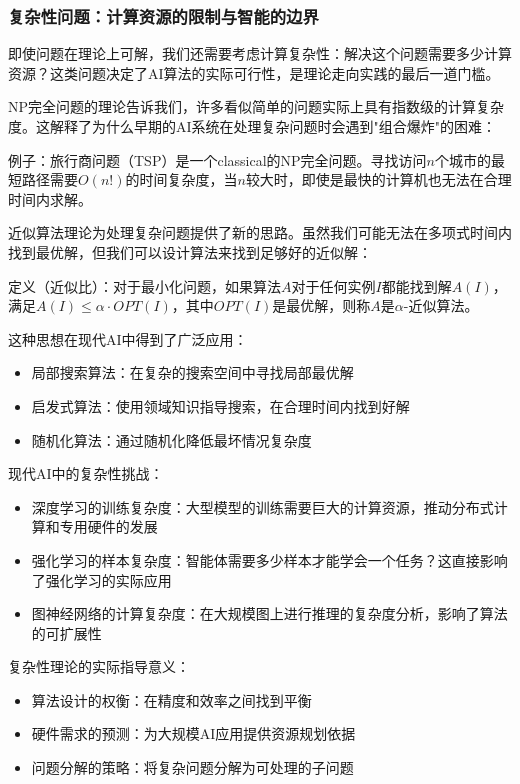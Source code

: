 \subsubsection{复杂性问题：计算资源的限制与智能的边界}

即使问题在理论上可解，我们还需要考虑计算复杂性：解决这个问题需要多少计算资源？这类问题决定了AI算法的实际可行性，是理论走向实践的最后一道门槛。

NP完全问题的理论告诉我们，许多看似简单的问题实际上具有指数级的计算复杂度。这解释了为什么早期的AI系统在处理复杂问题时会遇到"组合爆炸"的困难：

例子：旅行商问题（TSP）是一个classical的NP完全问题。寻找访问$n$个城市的最短路径需要$O(n!)$的时间复杂度，当$n$较大时，即使是最快的计算机也无法在合理时间内求解。

近似算法理论为处理复杂问题提供了新的思路。虽然我们可能无法在多项式时间内找到最优解，但我们可以设计算法来找到足够好的近似解：

定义（近似比）：对于最小化问题，如果算法$A$对于任何实例$I$都能找到解$A(I)$，满足$A(I) \leq \alpha \cdot OPT(I)$，其中$OPT(I)$是最优解，则称$A$是$\alpha$-近似算法。

这种思想在现代AI中得到了广泛应用：

\begin{itemize}
\item 局部搜索算法：在复杂的搜索空间中寻找局部最优解
\item 启发式算法：使用领域知识指导搜索，在合理时间内找到好解
\item 随机化算法：通过随机化降低最坏情况复杂度
\end{itemize}

现代AI中的复杂性挑战：

\begin{itemize}
\item 深度学习的训练复杂度：大型模型的训练需要巨大的计算资源，推动分布式计算和专用硬件的发展
\item 强化学习的样本复杂度：智能体需要多少样本才能学会一个任务？这直接影响了强化学习的实际应用
\item 图神经网络的计算复杂度：在大规模图上进行推理的复杂度分析，影响了算法的可扩展性
\end{itemize}

复杂性理论的实际指导意义：

\begin{itemize}
\item 算法设计的权衡：在精度和效率之间找到平衡
\item 硬件需求的预测：为大规模AI应用提供资源规划依据  
\item 问题分解的策略：将复杂问题分解为可处理的子问题
\end{itemize}

